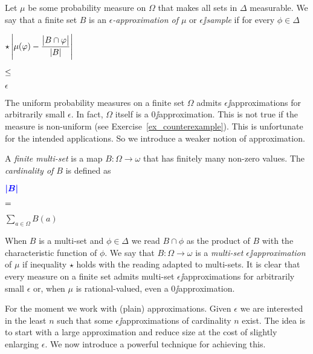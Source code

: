 \documentclass[creche.tex]{subfiles}
\begin{document}
\def\Av{\mathbin{\textrm{Av}}}
\def\disc{\mathbin{\textrm{disc}}}
\def\ceq#1#2#3{\parbox[t]{35ex}{$\displaystyle #1$}\parbox{5ex}{$\displaystyle\hfil #2$}{$\displaystyle #3$}}

Let $\mu$ be some probability measure on $\Omega$ that makes all sets in $\Delta$ measurable. We say that a finite set $B$ is an \emph{$\epsilon$-approximation of $\mu$\/} or \emph{$\epsilon\jj$sample\/} if for every $\phi\in\Delta$

\ceq{\star\hfill\left|\mu(\phi) - \frac{\big|B\cap\phi\big|}{|B|}\right|}{\le}{\epsilon}

The uniform probability measures on a finite set $\Omega$ admits $\epsilon\jj$approximations for arbitrarily small $\epsilon$. In fact, $\Omega$ itself is a $0\jj$approximation. This is not true if the measure is non-uniform (see Exercise~\ref{ex_counterexample}). This is unfortunate for the intended applications. So we introduce a weaker notion of approximation.

A \emph{finite multi-set\/} is a map $B:\Omega\to\omega$ that has finitely many non-zero values. The \emph{cardinality of $B$\/} is defined as

\ceq{\hfill\emph{$|B|$}}{=}{\sum_{a\in\Omega} B(a)}

When $B$ is a multi-set and $\phi\in\Delta$ we read \emph{$B\cap\phi$\/} as the product of $B$ with the characteristic function of $\phi$. We say that $B:\Omega\to\omega$ is a \emph{multi-set $\epsilon\jj$approximation\/} of $\mu$ if inequality $\star$ holds with the reading adapted to multi-sets. It is clear that every measure on a finite set admits multi-set $\epsilon\jj$approximations for arbitrarily small $\epsilon$ or, when $\mu$ is rational-valued, even a $0\jj$approximation. 

% 
% 

For the moment we work with (plain) approximations. Given $\epsilon$ we are interested in the least $n$ such that some $\epsilon\jj$approximations of cardinality $n$ exist. The idea is to start with a large approximation and reduce size at the cost of slightly enlarging $\epsilon$. We now introduce a powerful technique for achieving this.
\end{document}
